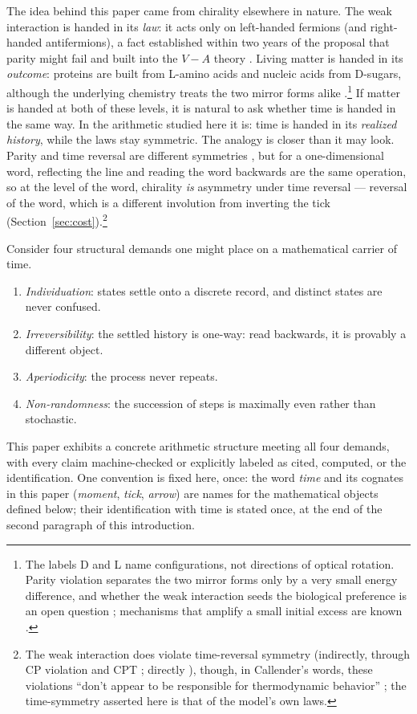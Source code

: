 \documentclass[11pt]{amsart}
\theoremstyle{plain}
\theoremstyle{definition}
\theoremstyle{remark}
\begin{document}
The idea behind this paper came from chirality elsewhere in nature. The weak interaction is handed in its \emph{law}: it acts only on left-handed fermions (and right-handed antifermions), a fact established within two years of the proposal that parity might fail \cite{leeyang1956} \cite{wu1957,garwin1957,goldhaber1958} and built into the $V{-}A$ theory \cite{feynmangellmann1958,sudarshanmarshak1958}. Living matter is handed in its \emph{outcome}: proteins are built from L-amino acids and nucleic acids from D-sugars, although the underlying chemistry treats the two mirror forms alike \cite{blackmond2019}.\footnote{The labels D and L name configurations, not directions of optical rotation. Parity violation separates the two mirror forms only by a very small energy difference, and whether the weak interaction seeds the biological preference is an open question \cite{blackmond2019,sallembien2022}; mechanisms that amplify a small initial excess are known \cite{frank1953,soai1995}.} If matter is handed at both of these levels, it is natural to ask whether time is handed in the same way. In the arithmetic studied here it is: time is handed in its \emph{realized history}, while the laws stay symmetric. The analogy is closer than it may look. Parity and time reversal are different symmetries \cite{barron1986}, but for a one-dimensional word, reflecting the line and reading the word backwards are the same operation, so at the level of the word, chirality \emph{is} asymmetry under time reversal --- reversal of the word, which is a different involution from inverting the tick (Section~\ref{sec:cost}).\footnote{The weak interaction does violate time-reversal symmetry (indirectly, through CP violation and CPT \cite{christenson1964}; directly \cite{babar2012}), though, in Callender's words, these violations ``don't appear to be responsible for thermodynamic behavior'' \cite{callender2026}; the time-symmetry asserted here is that of the model's own laws.}

Consider four structural demands one might place on a mathematical carrier of time.
\begin{enumerate}
\item[(i)] \emph{Individuation}: states settle onto a discrete record, and distinct states are never confused.

\item[(ii)] \emph{Irreversibility}: the settled history is one-way: read backwards, it is provably a different object.

\item[(iii)] \emph{Aperiodicity}: the process never repeats.
\item[(iv)] \emph{Non-randomness}: the succession of steps is maximally even rather than stochastic.
\end{enumerate}
This paper exhibits a concrete arithmetic structure meeting all four demands, with every claim machine-checked or explicitly labeled as  cited, computed, or the identification.{} One convention is fixed here, once: the word \emph{time} and its cognates in this paper (\emph{moment}, \emph{tick}, \emph{arrow})  are names for the mathematical objects defined below; their identification with time is stated once, at the end of the second paragraph of this introduction.
\end{document}
